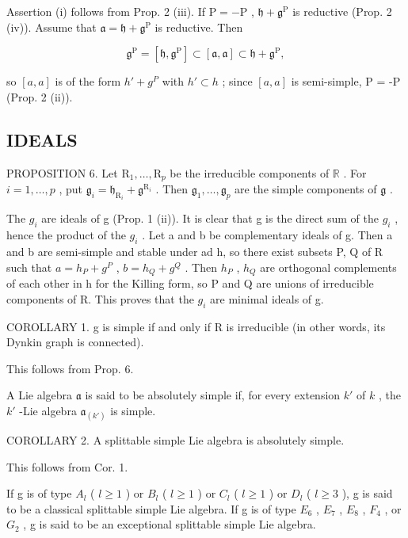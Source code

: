 Assertion (i) follows from Prop. 2 (iii). If \(\mathrm{P} = -\mathrm{P}\) , \(\mathfrak{h} + \mathfrak{g}^{\mathrm{P}}\) is reductive (Prop. 2 (iv)). Assume that \(\mathfrak{a} = \mathfrak{h} + \mathfrak{g}^{\mathrm{P}}\) is reductive. Then

\[
\mathfrak {g} ^ {\mathrm{P}} = \left[ \mathfrak {h}, \mathfrak {g} ^ {\mathrm{P}} \right] \subset \left[ \mathfrak {a}, \mathfrak {a} \right] \subset \mathfrak {h} + \mathfrak {g} ^ {\mathrm{P}},
\]

so \([a, a]\) is of the form \(h' + g^{P}\) with \(h' \subset h\) ; since \([a, a]\) is semi-simple, P = -P (Prop. 2 (ii)).

\subsection{IDEALS}

PROPOSITION 6. Let \(\mathrm{R}_1, \ldots, \mathrm{R}_p\) be the irreducible components of \(\mathbb{R}\) . For \(i = 1, \ldots, p\) , put \(\mathfrak{g}_i = \mathfrak{h}_{\mathrm{R}_i} + \mathfrak{g}^{\mathrm{R}_i}\) . Then \(\mathfrak{g}_1, \ldots, \mathfrak{g}_p\) are the simple components of \(\mathfrak{g}\) .

The \(g_{i}\) are ideals of g (Prop. 1 (ii)). It is clear that g is the direct sum of the \(g_{i}\) , hence the product of the \(g_{i}\) . Let a and b be complementary ideals of g. Then a and b are semi-simple and stable under ad h, so there exist subsets P, Q of R such that \(a = h_{P} + g^{P}\) , \(b = h_{Q} + g^{Q}\) . Then \(h_{P}\) , \(h_{Q}\) are orthogonal complements of each other in h for the Killing form, so P and Q are unions of irreducible components of R. This proves that the \(g_{i}\) are minimal ideals of g.

COROLLARY 1. g is simple if and only if R is irreducible (in other words, its Dynkin graph is connected).

This follows from Prop. 6.

A Lie algebra \(\mathfrak{a}\) is said to be absolutely simple if, for every extension \(k'\) of \(k\) , the \(k'\) -Lie algebra \(\mathfrak{a}_{(k')}\) is simple.

COROLLARY 2. A splittable simple Lie algebra is absolutely simple.

This follows from Cor. 1.

If g is of type \(A_{l}\) ( \(l \geq 1\) ) or \(B_{l}\) ( \(l \geq 1\) ) or \(C_{l}\) ( \(l \geq 1\) ) or \(D_{l}\) ( \(l \geq 3\) ), g is said to be a classical splittable simple Lie algebra. If g is of type \(E_{6}\) , \(E_{7}\) , \(E_{8}\) , \(F_{4}\) , or \(G_{2}\) , g is said to be an exceptional splittable simple Lie algebra.

